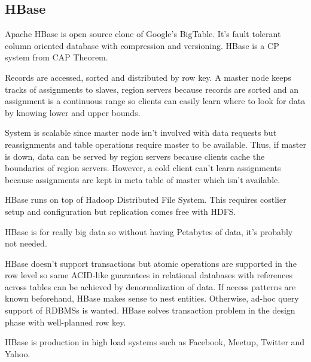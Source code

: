 \subsection{HBase}

Apache HBase is open source clone of Google's BigTable. It's fault tolerant column oriented database with compression and versioning. HBase is a CP system from CAP Theorem.

Records are accessed, sorted and distributed by row key. A master node keeps tracks of assignments to slaves, region servers because records are sorted and an assignment is a continuous range so clients can easily learn where to look for data by knowing lower and upper bounds.

System is scalable since master node isn't involved with data requests but reassignments and table operations require master to be available. Thus, if master is down, data can be served by region servers because clients cache the boundaries of region servers. However, a cold client can't learn assignments because assignments are kept in meta table of master which isn't available.

HBase runs on top of Hadoop Distributed File System. This requires costlier setup and configuration but replication comes free with HDFS.

HBase is for really big data so without having Petabytes of data, it's probably not needed.

HBase doesn't support transactions but atomic operations are supported in the row level so same ACID-like guarantees in relational databases with references across tables can be achieved by denormalization of data. If access patterns are known beforehand, HBase makes sense to nest entities. Otherwise, ad-hoc query support of RDBMSs is wanted. HBase solves transaction problem in the design phase with well-planned row key.

HBase is production in high load systems such as Facebook, Meetup, Twitter and Yahoo.


